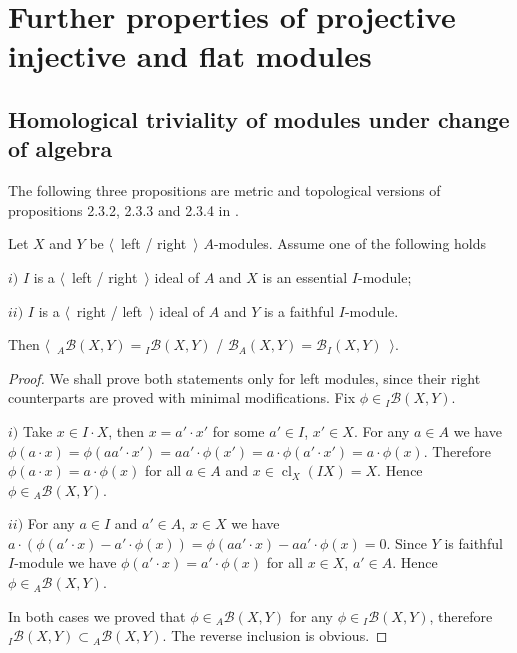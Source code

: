 
\section{Further properties of projective injective and flat modules}
\label{SectionFurtherPropertiesOfProjectiveInjectiveAndFlatModules}


\subsection{Homological triviality of modules under change of algebra}
\label{SubSectionHomologicalTrivialityOfModulesUnderChangeOfAlgebra}

The following three propositions are metric and topological versions of propositions 2.3.2, 2.3.3 and 2.3.4 in \cite{RamsHomPropSemgroupAlg}.

\begin{proposition}\label{MorphCoincide} Let $X$ and $Y$ be $\langle$~left / right~$\rangle$ $A$-modules. Assume one of the following holds

$i)$ $I$ is a $\langle$~left / right~$\rangle$ ideal of $A$ and $X$ is an essential $I$-module;

$ii)$ $I$ is a $\langle$~right / left~$\rangle$ ideal of $A$ and $Y$ is a faithful $I$-module. 

Then $\langle$~${}_A\mathcal{B}(X,Y)={}_I\mathcal{B}(X,Y)$ / $\mathcal{B}_A(X,Y)=\mathcal{B}_I(X,Y)$~$\rangle$.
\end{proposition}
\begin{proof} We shall prove both statements only for left modules, since their right counterparts are proved with minimal modifications. Fix $\phi\in {}_I\mathcal{B}(X,Y)$.

$i)$ Take $x\in I\cdot X$, then $x=a'\cdot x'$ for some $a'\in I$, $x'\in X$. For any $a\in A$ we have $\phi(a\cdot x)=\phi(aa'\cdot x')=aa'\cdot\phi(x')=a\cdot\phi(a'\cdot x')=a\cdot\phi(x)$. Therefore $\phi(a\cdot x)=a\cdot\phi(x)$ for all $a\in A$ and $x\in \operatorname{cl}_X(IX)=X$. Hence $\phi\in {}_A\mathcal{B}(X,Y)$.

$ii)$ For any $a\in I$ and $a'\in A$, $x\in X$ we have $a\cdot(\phi(a'\cdot x)-a'\cdot\phi(x))=\phi(aa'\cdot x)-aa'\cdot\phi(x)=0$. Since $Y$ is faithful $I$-module we have $\phi(a'\cdot x)=a'\cdot \phi(x)$ for all $x\in X$, $a'\in A$. Hence $\phi\in{}_A\mathcal{B}(X,Y)$.

In both cases we proved that $\phi\in{}_A\mathcal{B}(X,Y)$ for any $\phi\in{}_I\mathcal{B}(X,Y)$, therefore ${}_I\mathcal{B}(X,Y)\subset {}_A\mathcal{B}(X,Y)$. The reverse inclusion is obvious.
\end{proof}

